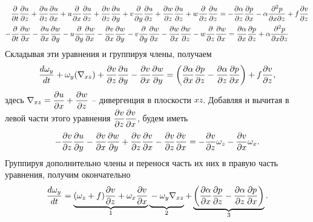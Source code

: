 \begin{align*}
    &\pd{}{t}\pd{u}{z}+\pd{u}{z}\pd{u}{x}+u\pd{}{x}\pd{u}{z}+\pd{v}{z}\pd{u}{y} + 
    v\pd{}{y}\pd{u}{z}+\pd{w}{z}\pd{u}{z}+w\pd{}{z}\pd{u}{z} = 
    -\pd{\alpha}{z}\pd{p}{x}-\alpha\frac{\partial^2p}{\partial x \partial z} + f\pd{v}{z} \\
    -&\pd{}{t}\pd{w}{x}-\pd{u}{x}\pd{w}{y}-u\pd{}{y}\pd{w}{x}-\pd{v}{x}\pd{w}{y} -
    v\pd{}{y}\pd{w}{x}-\pd{w}{x}\pd{w}{z}-w\pd{}{z}\pd{w}{x} = 
    \pd{\alpha}{x}\pd{p}{z}+\alpha\frac{\partial^2p}{\partial x \partial z} 
\end{align*}
Складывая эти уравнения и группируя члены, получаем
\begin{equation*}
    \td{\omega_y}{t}+\omega_y(\nabla_{xz})+\pd{v}{z}\pd{u}{y}-\pd{v}{x}\pd{w}{y} = \left( \pd{\alpha}{x}\pd{p}{z} - \pd{\alpha}{z}\pd{p}{x} \right) + f\pd{v}{z},
\end{equation*}
здесь $\nabla_{xz} = \pd{u}{x} +\pd{w}{z}$ -- дивергенция в плоскости $xz$. 
Добавляя и вычитая в левой части этого уравнения $\pd{v}{z}\pd{v}{x}$, будем иметь
\begin{equation*}
    -\pd{v}{z}\pd{u}{y}-\pd{v}{x}\pd{w}{y}+\pd{v}{z}\pd{v}{x}-\pd{v}{z}\pd{v}{x} = -\pd{v}{z} \omega_z - \pd{v}{x} \omega_x.
\end{equation*}
Группируя дополнительно члены и перенося часть их них в правую часть уравнения, получим окончательно
\begin{equation}
\label{eq:ch10_omegay}
    \td{\omega_y}{t}=
    \underbrace{(\omega_z+f)\pd{v}{z} + \omega_x\pd{v}{x}}_{1}
    \underbrace{\vphantom{(\omega_z+f)\pd{v}{z} + \omega_x\pd{v}{x}}-\omega_y\nabla_{xz}}_{2}+
    \underbrace{\left( \pd{\alpha}{x}\pd{p}{z} - \pd{\alpha}{z}\pd{p}{x} \right)}_{3}.
\end{equation}

